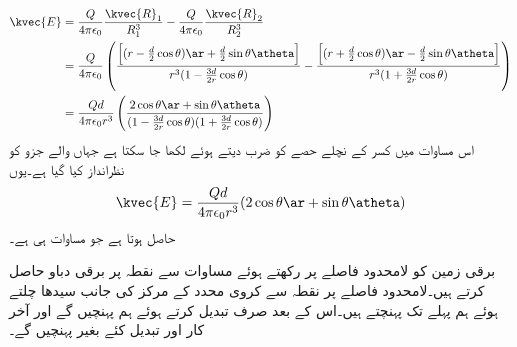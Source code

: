 \begin{align*}
\kvec{E}&=\frac{Q}{4\pi\epsilon_0} \frac{\kvec{R}_1}{R_1^3}-\frac{Q}{4\pi\epsilon_0} \frac{\kvec{R}_2}{R_2^3}\\
&=\frac{Q}{4\pi\epsilon_0}\left(\frac{\left[(r-\frac{d}{2}\cos\theta)\ar+\frac{d}{2}\sin\theta \atheta\right]}{r^3 (1-\frac{3d}{2r} \cos \theta)}-\frac{\left[(r+\frac{d}{2}\cos \theta )\ar-\frac{d}{2}\sin \theta \atheta\right]}{r^3 (1+\frac{3d}{2r} \cos \theta)} \right)\\
&=\frac{Qd }{4\pi\epsilon_0 r^3}\left( \frac{2 \cos \theta \ar+\sin \theta \atheta}{(1-\frac{3d}{2r} \cos \theta)(1+\frac{3d}{2r} \cos \theta)}\right)
\end{align*}
اس مساوات میں کسر کے نچلے حصے کو ضرب دیتے ہوئے  لکھا جا سکتا ہے جہاں  والے جزو کو نظرانداز کیا گیا ہے۔یوں
\begin{align}\label{مساوات_توانائی_جفت_قطب_دور_میدان_ب}
\kvec{E}=\frac{Qd }{4\pi\epsilon_0 r^3}( 2 \cos \theta \ar+\sin \theta \atheta)
\end{align}
حاصل ہوتا ہے جو مساوات  ہی ہے۔

برقی زمین کو لامحدود فاصلے پر رکھتے ہوئے  مساوات  سے نقطہ  پر برقی دباو حاصل کرتے ہیں۔لامحدود فاصلے پر نقطہ   سے کروی محدد کے مرکز کی جانب سیدھا چلتے ہوئے ہم پہلے  تک پہنچتے ہیں۔اس کے بعد صرف  تبدیل کرتے ہوئے ہم  پہنچیں گے اور آخر کار  اور  تبدیل کئے بغیر  پہنچیں گے۔  

